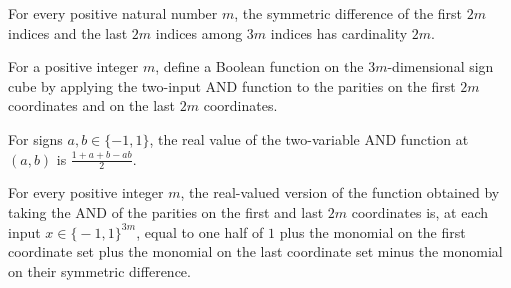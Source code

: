 \begin{theorem}
\label{FABL.card_firstTwoThirds_symmDiff_lastTwoThirds}
\leanok
{}
For every positive natural number $m$, the symmetric difference of the first $2m$
indices and the last $2m$ indices among $3m$ indices has cardinality $2m$.
\end{theorem}

\begin{definition}
\label{FABL.correlationImmuneAndExample}
\leanok
{}
For a positive integer $m$, define a Boolean function on the $3m$-dimensional sign cube
by applying the two-input AND function to the parities on the first $2m$ coordinates and
on the last $2m$ coordinates.
\end{definition}

\begin{theorem}
\label{FABL.andFunction_two_toReal}
\leanok
{}
For signs $a,b\in\{-1,1\}$, the real value of the two-variable AND function at $(a,b)$
is $\frac{1+a+b-ab}{2}$.
\end{theorem}

\begin{theorem}
\label{FABL.correlationImmuneAndExample_toReal}
\leanok
{}
For every positive integer $m$, the real-valued version of the function obtained by
taking the AND of the parities on the first and last $2m$ coordinates is, at each input
$x\in\{\!-1,1\!\}^{3m}$, equal to one half of $1$ plus the monomial on the first
coordinate set plus the monomial on the last coordinate set minus the monomial on their
symmetric difference.
\end{theorem}

